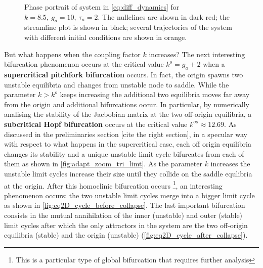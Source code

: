 \begin{figure}[H]
        \caption{\label{fig:eq2D_cycle} Phase portrait of system in \eqref{eq:diff_dynamics} for $k=8.5,\ g_a=10,\ \tau_a=2$. The nullclines are shown in dark red; the streamline plot is shown in black; several trajectories of the system with different initial conditions are shown in orange.}
\end{figure}

But what happens when the coupling factor $k$ increases? The next interesting bifurcation phenomenon occurs at the critical value $k^o = g_a + 2$ when a \textbf{supercritical pitchfork bifurcation} occurs. In fact, the origin spawns two unstable equilibria and changes from unstable node to saddle. While the parameter $k > k^o$ keeps increasing the additional two equilibria moves far away from the origin and additional bifurcations occur. In particular, by numerically analising the stability of the Jacbobian matrix at the two off-origin equilibria, a \textbf{subcritical Hopf bifurcation} occurs at the critical value $k^{oo} \approx 12.69$. As discussed in the preliminaries section [cite the right section], in a specular way with respect to what happens in the supercritical case, each off origin equilibria changes its stability and a unique unstable limit cycle bifurcates from each of them as shown in \cref{fig:adapt_zoom_tri_limt}. As the parameter $k$ increases the unstable limit cycles increase their size until they collide on the saddle equlibria at the origin. After this homoclinic bifurcation occurs \footnote{This is a particular type of global bifurcation that requires further analysis},
 an interesting phenomenon occurs: the two unstable limit cycles merge into a bigger limit cycle as shown in \cref{fig:eq2D_cycle_before_collapse}. The last important bifurcation consists in the mutual annihilation of the inner (unstable) and outer (stable) limit cycles after which the only attractors in the system are the two off-origin equilibria (stable) and the origin (unstable) (\cref{fig:eq2D_cycle_after_collapse}).

